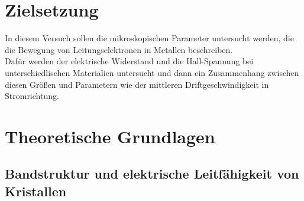 \section{Zielsetzung}
In diesem Versuch sollen die mikroskopischen Parameter untersucht werden, 
die die Bewegung von Leitungselektronen in Metallen beschreiben.\\
Dafür werden der elektrische Widerstand und die Hall-Spannung bei unterschiedlischen Materialien 
untersucht und dann ein Zusammenhang zwischen diesen Größen und Parametern wie der mittleren Driftgeschwindigkeit in Stromrichtung.



\section{Theoretische Grundlagen}

\subsection{Bandstruktur und elektrische Leitfähigkeit von Kristallen}

